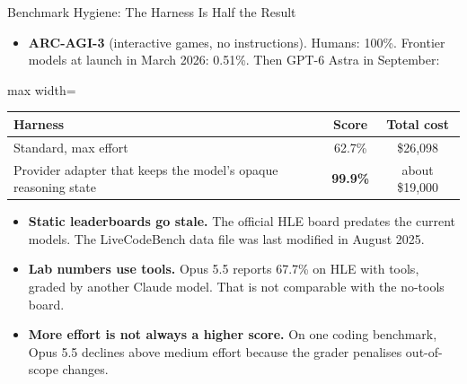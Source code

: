 \begin{frame}{Benchmark Hygiene: The Harness Is Half the Result}
    \begin{itemize}\itemsep0.45em
        \item \textbf{ARC-AGI-3} (interactive games, no instructions). Humans: 100\%. Frontier models at launch in March 2026: 0.51\%. Then GPT-6 Astra in September:
    \end{itemize}
    \begin{center}
    \small
    \begin{adjustbox}{max width=\linewidth}\begin{tabular}{lcc}
        \toprule
        \textbf{Harness} & \textbf{Score} & \textbf{Total cost} \\
        \midrule
        Standard, max effort & 62.7\% & \$26,098 \\
        \rowcolor{KAUSTcyan!12} Provider adapter that keeps the model's opaque reasoning state & \textbf{99.9\%} & about \$19,000 \\
        \bottomrule
    \end{tabular}\end{adjustbox}
    \end{center}
    \begin{itemize}\itemsep0.45em
        \item \textbf{Static leaderboards go stale.} The official HLE board predates the current models. The LiveCodeBench data file was last modified in August 2025.
        \item \textbf{Lab numbers use tools.} Opus 5.5 reports 67.7\% on HLE with tools, graded by another Claude model. That is not comparable with the no-tools board.
        \item \textbf{More effort is not always a higher score.} On one coding benchmark, Opus 5.5 declines above medium effort because the grader penalises out-of-scope changes.
    \end{itemize}
\end{frame}

